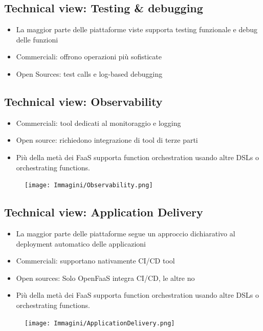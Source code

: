 \documentclass[a4paper, 12pt]{report}
\begin{document}
            \subsection{Technical view: Testing \& debugging}
            \begin{itemize}
              \item La maggior parte delle piattaforme viste supporta testing funzionale e debug delle funzioni
              \item Commerciali: offrono operazioni più sofisticate
              \item Open Sources: test calls e log-based debugging
            \end{itemize}
            \clearpage
            \subsection{Technical view: Observability}
            \begin{itemize}
              \item Commerciali: tool dedicati al monitoraggio e logging
              \item Open source: richiedono integrazione di tool di terze parti
            \end{itemize}
            \begin{itemize}
              \item Più della metà dei FaaS supporta function orchestration usando altre DSLs o orchestrating functions.
            \end{itemize}
            \begin{figure}[h]
              \centering
              \texttt{[image: Immagini/Observability.png]}
            \end{figure}
            \subsection{Technical view: Application Delivery}
            \begin{itemize}
              \item La maggior parte delle piattaforme segue un approccio dichiarativo al deployment automatico delle applicazioni
              \item Commerciali: supportano nativamente CI/CD tool
              \item Open sources: Solo OpenFaaS integra CI/CD, le altre no
            \end{itemize}
            \begin{itemize}
              \item Più della metà dei FaaS supporta function orchestration usando altre DSLs o orchestrating functions.
            \end{itemize}
            \begin{figure}[h]
              \centering
              \texttt{[image: Immagini/ApplicationDelivery.png]}
            \end{figure}
\end{document}
